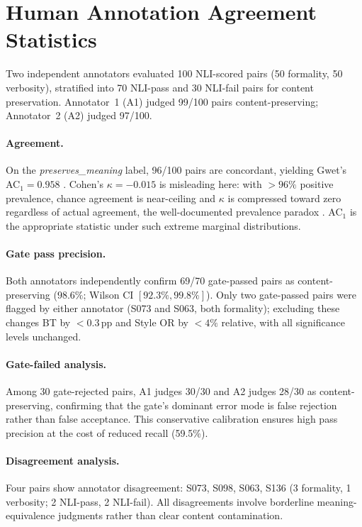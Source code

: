 \section{Human Annotation Agreement Statistics}
\label{app:annotation_agreement}

Two independent annotators evaluated 100 NLI-scored pairs (50 formality, 50 verbosity), stratified into 70 NLI-pass and 30 NLI-fail pairs for content preservation.
Annotator~1 (A1) judged 99/100 pairs content-preserving; Annotator~2 (A2) judged 97/100.

\paragraph{Agreement.}
On the \emph{preserves\_meaning} label, 96/100 pairs are concordant, yielding Gwet's AC$_1 = 0.958$ \citep{gwet2008ac1}.
Cohen's $\kappa = {-}0.015$ is misleading here: with ${>}96\%$ positive prevalence, chance agreement is near-ceiling and $\kappa$ is compressed toward zero regardless of actual agreement, the well-documented prevalence paradox \citep{feinstein1990kappa}.
AC$_1$ is the appropriate statistic under such extreme marginal distributions.

\paragraph{Gate pass precision.}
Both annotators independently confirm 69/70 gate-passed pairs as content-preserving ($98.6\%$; Wilson CI $[92.3\%, 99.8\%]$).
Only two gate-passed pairs were flagged by either annotator (S073 and S063, both formality); excluding these changes BT by ${<}0.3$\,pp and Style OR by ${<}4\%$ relative, with all significance levels unchanged.

\paragraph{Gate-failed analysis.}
Among 30 gate-rejected pairs, A1 judges 30/30 and A2 judges 28/30 as content-preserving, confirming that the gate's dominant error mode is false rejection rather than false acceptance.
This conservative calibration ensures high pass precision at the cost of reduced recall (59.5\%).

\paragraph{Disagreement analysis.}
Four pairs show annotator disagreement: S073, S098, S063, S136 (3 formality, 1 verbosity; 2 NLI-pass, 2 NLI-fail).
All disagreements involve borderline meaning-equivalence judgments rather than clear content contamination.

